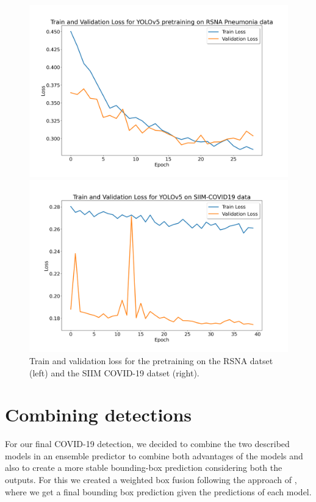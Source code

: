 \begin{figure}[h!]
	\centering
	\begin{minipage}{.5\textwidth}
		\centering
		\includegraphics[width=\linewidth]{img/loss_yolo_30.png}
	\end{minipage}%
	\begin{minipage}{0.5\textwidth}
		\centering
		\includegraphics[width=\linewidth]{img/loss_yolo_giou_40_siim.png}
	\end{minipage}
\caption{Train and validation loss for the pretraining on the RSNA datset (left) and the SIIM COVID-19 datset (right).}
\label{fig:yolo_losses}
\end{figure}


\newpage
\section{Combining detections}
For our final COVID-19 detection, we decided to combine the two described models in an ensemble predictor to combine both advantages of the models and also to create a more stable bounding-box prediction considering both the outputs. For this we created a weighted box fusion following the approach of \citeauthor{weightedBoxFusion} \autocite{weightedBoxFusion}, where we get a final bounding box prediction given the predictions of each model.

